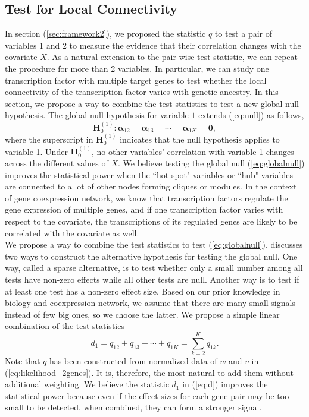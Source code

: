 \documentclass[aap,authoryear, preprint]{imsart}
\numberwithin{equation}{section}
\theoremstyle{plain}
\begin{document}
\subsection{Test for Local Connectivity \label{sec:frameworkK}} 
In section (\ref{sec:framework2}), we proposed the statistic $q$ to test a pair of variables 1 and 2 to measure the evidence that their correlation changes with the covariate $X$. As a natural extension to the pair-wise test statistic, we can repeat the procedure for more than 2 variables. In particular, we can study one transcription factor with  multiple target genes to test whether the local connectivity of the transcription factor varies with genetic ancestry. In this section, we propose a way to combine the test statistics to test a new global null hypothesis. The global null hypothesis for variable $1$ extends (\ref{eq:null}) as follows,
\begin{equation}
    \bm{H}_0^{(1)}: \bm{\alpha}_{12} = \bm{\alpha}_{13} = \cdots = \bm{\alpha}_{1K} = \bm{0},
\label{eq:globalnull}
\end{equation}
where the superscript in $\bm{H}_0^{(1)}$ indicates that the null hypothesis applies to variable 1. Under $\bm{H}_0^{(1)}$, no other variables' correlation with variable 1 changes across the different values of  $X$. We believe testing the global null (\ref{eq:globalnull}) improves the statistical power when the ``hot spot" variables or ``hub" variables are connected to a lot of other nodes forming cliques or modules. In the context of gene coexpression network, we know that transcription factors regulate the gene expression of multiple genes, and if one transcription factor varies with respect to the covariate, the transcriptions of its regulated genes are likely to be correlated with the covariate as well. \\

We propose a way to combine the test statistics to test (\ref{eq:globalnull}). \cite{chen2012exponential} discusses two ways to construct the alternative hypothesis for testing the global null. One way, called a sparse alternative, is to test whether only a small number among all tests have non-zero effects while all other tests are null. Another way is to test if at least one test has a non-zero effect size. Based on our prior knowledge in biology and coexpression network, we assume that there are many small signals instead of few big ones, so we choose the latter. We propose a simple linear combination of the test statistics
\begin{equation}
d_1 = {q}_{12} + {q}_{13} + \cdots + {q}_{1K} = \sum_{k=2}^{K} {q}_{1k}.
\label{eq:d}
\end{equation}
Note that $q$ has been constructed from normalized data of $w$ and $v$ in (\ref{eq:likelihood_2genes}). It is, therefore, the most natural to add them without additional weighting. We believe the statistic $d_1$ in  (\ref{eq:d}) improves the statistical power because even if the effect sizes for each gene pair may be too small to be detected, when combined, they can form a stronger signal. \\
\end{document}
